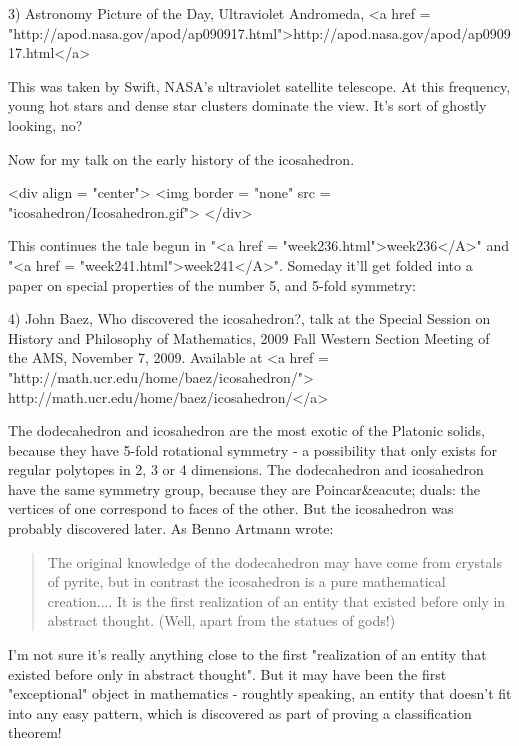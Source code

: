 3) Astronomy Picture of the Day, Ultraviolet Andromeda, 
<a href = "http://apod.nasa.gov/apod/ap090917.html">http://apod.nasa.gov/apod/ap090917.html</a>

This was taken by Swift, NASA's ultraviolet satellite telescope.
At this frequency, young hot stars and dense star clusters dominate 
the view.  It's sort of ghostly looking, no?

Now for my talk on the early history of the icosahedron. 

<div align = "center">
<img border = "none" src = "icosahedron/Icosahedron.gif">
</div>

 This
continues the tale begun in "<a href =
"week236.html">week236</A>" and "<a href =
"week241.html">week241</A>".  Someday it'll get folded into a
paper on special properties of the number 5, and 5-fold symmetry:

4) John Baez, Who discovered the icosahedron?, talk at the Special 
Session on History and Philosophy of Mathematics, 2009 Fall Western 
Section Meeting of the AMS, November 7, 2009. 
Available at <a href = "http://math.ucr.edu/home/baez/icosahedron/">
http://math.ucr.edu/home/baez/icosahedron/</a>

The dodecahedron and icosahedron are the most exotic of the Platonic
solids, because they have 5-fold rotational symmetry - a possibility
that only exists for regular polytopes in 2, 3 or 4 dimensions.  The
dodecahedron and icosahedron have the same symmetry group, because 
they are Poincar&eacute; duals: the vertices of one correspond to faces of
the other.  But the icosahedron was probably discovered later.  As 
Benno Artmann wrote:

\begin{quote}
  The original knowledge of the dodecahedron may have come from 
  crystals of pyrite, but in contrast the icosahedron is a pure 
  mathematical creation.... It is the first realization of an 
  entity that existed before only in abstract thought.  (Well,  
  apart from the statues of gods!)
\end{quote}
    

I'm not sure it's really anything close to the first "realization of 
an entity that existed before only in abstract thought".  But 
it may have been the first "exceptional" object in mathematics - 
roughtly speaking, an entity that doesn't fit into any easy pattern,
which is discovered as part of proving a classification theorem!   

